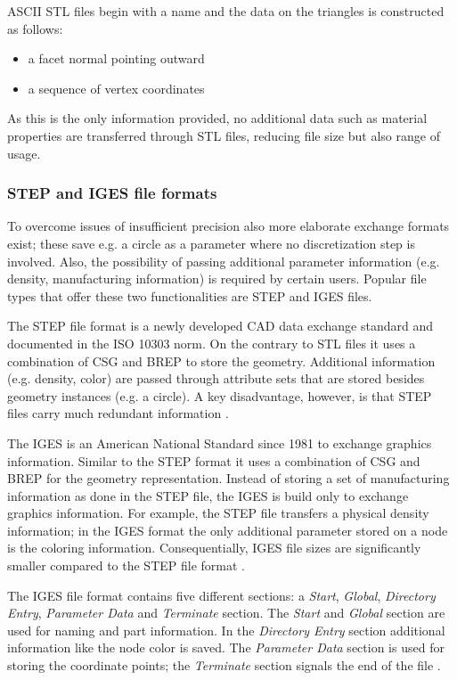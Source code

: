 ASCII \ac{STL} files begin with a name and the data on the triangles is constructed as follows: 
\begin{itemize}
\item a facet normal pointing outward
\item a sequence of vertex coordinates
\end{itemize}
As this is the only information provided, no additional data such as material properties are transferred through \ac{STL} files, reducing file size but also range of usage.
\subsubsection{\acs{STEP} and \acs{IGES} file formats}
To overcome issues of insufficient precision also more elaborate exchange formats exist; these save e.g. a circle as a parameter where no discretization step is involved. Also, the possibility of passing additional parameter information (e.g. density, manufacturing information) is required by certain users. Popular file types that offer these two functionalities are \acf{STEP} and \acf{IGES} files. 

The \ac{STEP} file format is a newly developed \ac{CAD} data exchange standard and documented in the ISO 10303 norm. On the contrary to \ac{STL} files it uses a combination of \ac{CSG} and \ac{BREP} to store the geometry. Additional information (e.g. density, color) are passed through attribute sets that are stored besides geometry instances (e.g. a circle). A key disadvantage, however, is that \ac{STEP} files carry much redundant information \cite{STL}.


The \acl{IGES} is an American National Standard since 1981 to exchange graphics information. Similar to the \ac{STEP} format it uses a combination of \ac{CSG} and \ac{BREP} for the geometry representation. Instead of storing a set of manufacturing information as done in the \ac{STEP} file, the \ac{IGES} is build only to exchange graphics information. For example, the \ac{STEP} file transfers a physical density information; in the \ac{IGES} format the only additional parameter stored on a node is the coloring information. Consequentially, \ac{IGES} file sizes are significantly smaller compared to the \ac{STEP} file format \cite{STL}.

The \ac{IGES} file format contains five different sections: a \emph{Start}, \emph{Global}, \emph{Directory Entry}, \emph{Parameter Data} and \emph{Terminate} section. The \emph{Start} and \emph{Global} section are used for naming and part information. In the \emph{Directory Entry} section additional information like the node color is saved. The \emph{Parameter Data} section is used for storing the coordinate points; the \emph{Terminate} section signals the end of the file \cite{sarcarCAD}.
